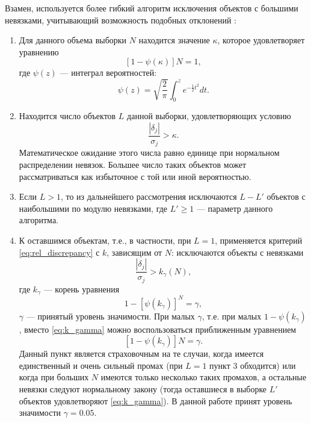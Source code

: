 \documentclass[a4paper, oneside, 14pt]{article}
\newcommand{\npar}{\par\vspace{\baselineskip}}
\begin{document}
Взамен, используется более гибкий алгоритм исключения объектов с большими невязками, учитывающий возможность подобных отклонений \cite{N.2003}:\npar

\begin{enumerate}
  \item Для данного объема выборки $ N $ находится значение $ \kappa $, которое удовлетворяет уравнению
  \begin{equation}
    \left[ 1 - \psi(\kappa) \right] N = 1,
  \end{equation}
  где $ \psi(z) $ --- интеграл вероятностей:
  \begin{equation}
    \psi(z) = \sqrt{\frac{2}{\pi}} \int_0^z e^{-\frac{1}{2} t^2} dt.
  \end{equation}

  \item Находится число объектов $ L $ данной выборки, удовлетворяющих условию
  \begin{equation}
    \label{eq:kappa_condition}
    \frac{|\delta_j|}{\sigma_j} > \kappa.
  \end{equation}
  Математическое ожидание этого числа равно единице при нормальном распределении невязок. Большее число таких объектов может рассматриваться как избыточное с той или иной вероятностью.

  \item Если $ L > 1 $, то из дальнейшего рассмотрения исключаются $ L - L' $ объектов с наибольшими по модулю невязками, где $ L' \ge 1 $ --- параметр данного алгоритма.

  \item К оставшимся объектам, т.е., в частности, при $ L = 1 $, применяется критерий \eqref{eq:rel_discrepancy} с $ k $, зависящим от $ N $: исключаются объекты с невязками
  \begin{equation}
    \frac{|\delta_j|}{\sigma_j} > k_\gamma(N),
  \end{equation}
  где $ k_\gamma $ --- корень уравнения
  \begin{equation}
    \label{eq:k_gamma}
    1 - \left[ \psi(k_\gamma) \right]^N = \gamma,
  \end{equation}
  $ \gamma $ --- принятый уровень значимости. При малых $ \gamma $, т.е. при малых $ 1 - \psi(k_\gamma) $, вместо \eqref{eq:k_gamma} можно воспользоваться приближенным уравнением
  \begin{equation}
    \left[ 1 - \psi(k_\gamma) \right] N = \gamma.
  \end{equation}
  Данный пункт является страховочным на те случаи, когда имеется единственный и очень сильный промах (при $ L = 1 $ пункт 3 обходится) или когда при больших $ N $ имеются только несколько таких промахов, а остальные невязки следуют нормальному закону (тогда оставшиеся в выборке $ L'$ объектов удовлетворяют \eqref{eq:k_gamma}). В данной работе принят уровень значимости $ \gamma = 0.05 $.
\end{enumerate}
\end{document}
